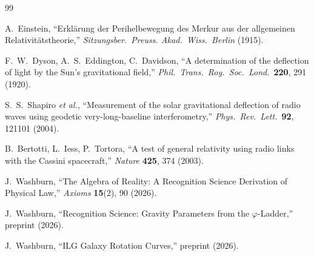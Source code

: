 \documentclass[12pt,a4paper]{article}
\theoremstyle{definition}
\theoremstyle{remark}
\begin{document}
\begin{thebibliography}{99}

A.~Einstein, ``Erkl\"{a}rung der Perihelbewegung des Merkur aus der
allgemeinen Relativit\"{a}tstheorie,'' \textit{Sitzungsber.\ Preuss.
Akad.\ Wiss.\ Berlin} (1915).

F.~W.~Dyson, A.~S.~Eddington, C.~Davidson, ``A determination of the
deflection of light by the Sun's gravitational field,'' \textit{Phil.\
Trans.\ Roy.\ Soc.\ Lond.}\ \textbf{220}, 291 (1920).

S.~S.~Shapiro \textit{et al.}, ``Measurement of the solar gravitational
deflection of radio waves using geodetic very-long-baseline
interferometry,'' \textit{Phys.\ Rev.\ Lett.}\ \textbf{92}, 121101
(2004).

B.~Bertotti, L.~Iess, P.~Tortora, ``A test of general relativity using
radio links with the Cassini spacecraft,'' \textit{Nature}
\textbf{425}, 374 (2003).

J.~Washburn, ``The Algebra of Reality: A Recognition Science Derivation
of Physical Law,'' \textit{Axioms} \textbf{15}(2), 90 (2026).

J.~Washburn, ``Recognition Science: Gravity Parameters from the
$\varphi$-Ladder,'' preprint (2026).

J.~Washburn, ``ILG Galaxy Rotation Curves,'' preprint (2026).

\end{thebibliography}
\end{document}

